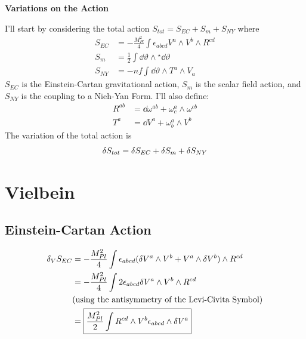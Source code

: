 \documentclass[12pt]{article}
\newcommand{\hodge}{{^\star}}
\begin{document}
\begin{center}
  \Large\textbf{Variations on the Action} \\
  \large{}
\end{center}

I'll start by considering the total action $S_{tot} = S_{EC} + S_m + S_{NY}$ where
\begin{align}
  S_{EC} &= -\frac{M_{Pl}^2}{4}\int\epsilon_{abcd}V^a \wedge V^b \wedge R^{cd} \\
  S_m &= \frac{1}{2}\int\dd\vartheta\wedge\hodge\dd\vartheta \\
  S_{NY} &= -\mathit{nf}\int\dd\vartheta\wedge T^a \wedge V_a
\end{align}
$S_{EC}$ is the Einstein-Cartan gravitational action, $S_m$ is the scalar field action, and $S_{NY}$ is the coupling to a Nieh-Yan Form. I'll also define:
\begin{align*}
  R^{ab} &= \dd\omega^{ab} + \omega^a_c \wedge \omega^{cb} \\
  T^a &= \dd V^a + \omega^a_b \wedge V^b
\end{align*}
The variation of the total action is
\begin{align}
  \var{S_{tot}} = \var{S_{EC}} + \var{S_m} + \var{S_{NY}}
\end{align}

\section{Vielbein}
\subsection{Einstein-Cartan Action}
\begin{align}
  \var_V{S_{EC}} &= -\frac{M_{Pl}^2}{4}\int \epsilon_{abcd}(\var V^a \wedge V^b + V^a \wedge \var V^b) \wedge R^{cd} \nonumber \\
  &= -\frac{M_{Pl}^2}{4}\int 2\epsilon_{abcd}\var V^a \wedge V^b \wedge R^{cd} \nonumber \\ &\text{(using the antisymmetry of the Levi-Civita Symbol)} \nonumber\\
  &= \boxed{\frac{M_{Pl}^2}{2}\int R^{cd} \wedge V^b \epsilon_{abcd} \wedge \var V^a}
\end{align}
\end{document}
